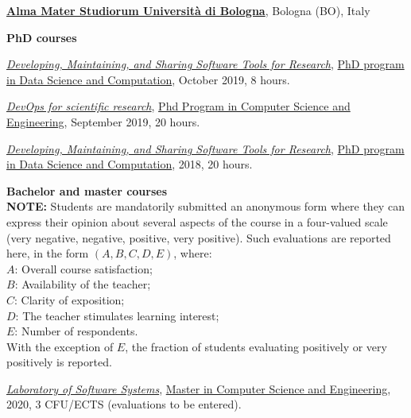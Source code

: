 \href{http://www.unibo.it}{\textbf{Alma Mater Studiorum Università di Bologna}}, Bologna (BO), Italy
\begin{outerlist}
\item[] \textbf{PhD courses} %
    \begin{innerlist}
      \item \href{https://bitbucket.org/danysk/courses-2018-developing-maintaining-and-sharing-software-tools/downloads/}{\textit{Developing, Maintaining, and Sharing Software Tools for Research}}, \href{http://archive.fo/Fmxxm}{PhD program in Data Science and Computation}, October 2019, 8 hours.
      \item \href{http://archive.fo/HKAC6/}{\textit{DevOps for scientific research}}, \href{http://archive.fo/ppTiB}{Phd Program in Computer Science and Engineering}, September 2019, 20 hours.
      \item \href{https://bitbucket.org/danysk/courses-2018-developing-maintaining-and-sharing-software-tools/downloads/}{\textit{Developing, Maintaining, and Sharing Software Tools for Research}}, \href{http://archive.fo/Fmxxm}{PhD program in Data Science and Computation}, 2018, 20 hours.
    \end{innerlist}
\item[] \textbf{Bachelor and master courses} %
    \scriptsize{\\ \textbf{NOTE:} Students are mandatorily submitted an anonymous form where they can express their opinion about several aspects of the course in a four-valued scale (very negative, negative, positive, very positive). Such evaluations are reported here, in the form $(A, B, C, D, E)$, where:
    \\$A$: Overall course satisfaction;
    \\$B$: Availability of the teacher;
    \\$C$: Clarity of exposition;
    \\$D$: The teacher stimulates learning interest;
    \\$E$: Number of respondents.
    \\With the exception of $E$, the fraction of students evaluating positively or very positively is reported.
    }
    \normalsize
    \begin{innerlist}
      \item \href{https://archive.is/CyIjt}{\textit{Laboratory of Software Systems}}, \href{https://archive.is/Svmye}{Master in Computer Science and Engineering}, 2020, 3 CFU/ECTS (evaluations to be entered).

\end{innerlist}
\end{outerlist}

